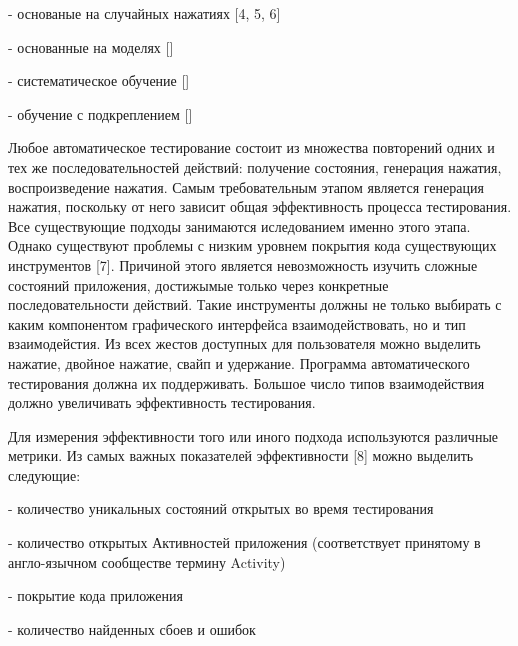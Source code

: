  - основаные на случайных нажатиях [4, 5, 6]
 
 - основанные на моделях []
 
 - систематическое обучение []
 
 - обучение с подкреплением []
 
Любое автоматическое тестирование состоит из множества повторений одних и тех же последовательностей действий: получение состояния, генерация нажатия, воспроизведение нажатия. Самым требовательным этапом является генерация нажатия, поскольку от него зависит общая эффективность процесса тестирования. Все существующие подходы занимаются иследованием именно этого этапа. Однако существуют проблемы с низким уровнем покрытия кода существующих инструментов [7]. Причиной этого является невозможность изучить сложные состояний приложения, достижымые только через конкретные последовательности действий. Такие инструменты должны не только выбирать с каким компонентом графического интерфейса взаимодействовать, но и тип взаимодейстия. Из всех жестов доступных для пользователя можно выделить нажатие, двойное нажатие, свайп и удержание. Программа автоматического тестирования должна их поддерживать. Большое число типов взаимодействия должно увеличивать эффективность тестирования. 

Для измерения эффективности того или иного подхода используются различные метрики. Из самых важных показателей эффективности [8] можно выделить следующие:

- количество уникальных состояний открытых во время тестирования

- количество открытых Активностей приложения (соответствует принятому в англо-язычном сообществе термину Activity)

- покрытие кода приложения

- количество найденных сбоев и ошибок

